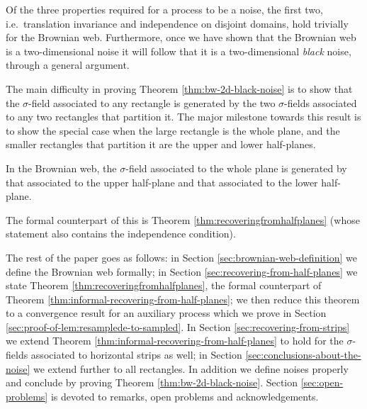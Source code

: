 {Of the three properties required for a process to be a noise, the
first two, i.e.\ translation invariance and independence on disjoint
domains, hold trivially for the Brownian web.  Furthermore, once we
have shown that the Brownian web is a two-dimensional noise it will
follow that it is a two-dimensional \emph{black} noise,
through a general argument.

The main difficulty in proving
Theorem \ref{thm:bw-2d-black-noise} is to show that the $\sigma$-field
associated to any rectangle is generated by the two $\sigma$-fields
associated to any two rectangles that partition it.
The major milestone towards this result is to show the special case
when the large rectangle is the whole plane, and the smaller
rectangles that partition it are the upper and lower half-planes.

\begin{theorem}
\label{thm:informal-recovering-from-half-planes}
In the Brownian web, the $\sigma$-field associated to the whole plane
is generated by that associated to the upper half-plane and that
associated to the lower half-plane.
\end{theorem}

The formal counterpart of this is
Theorem \ref{thm:recoveringfromhalfplanes} (whose statement also
contains the independence condition).

The rest of the paper goes as follows: in Section \ref{sec:brownian-web-definition} we define the
Brownian web formally; in Section \ref{sec:recovering-from-half-planes} we state Theorem \ref{thm:recoveringfromhalfplanes}, the formal
counterpart of Theorem \ref{thm:informal-recovering-from-half-planes}; we then reduce this theorem to a
convergence result for an auxiliary process which we prove in Section
\ref{sec:proof-of-lem:resamplede-to-sampled}.  In Section \ref{sec:recovering-from-strips} we extend Theorem \ref{thm:informal-recovering-from-half-planes} to hold for the
$\sigma$-fields associated to horizontal strips as well; in Section \ref{sec:conclusions-about-the-noise}
we extend further to all rectangles.  In addition we define noises
properly and conclude by proving Theorem \ref{thm:bw-2d-black-noise}.  Section \ref{sec:open-problems} is devoted to
remarks, open problems and acknowledgements.
}
